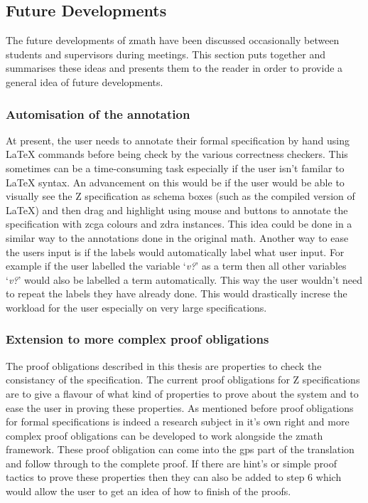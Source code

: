 \subsection{Future Developments}
\label{subsec:futuredevelopments}

The future developments of \gls{zmath} have been discussed occasionally between
students and supervisors during meetings. This section puts together and
summarises these ideas and presents them to the reader in order to provide a
general idea of future developments.

\subsubsection{Automisation of the annotation}
\label{subsubsec:automisation}

At present, the user needs to annotate their formal specification by hand using
\LaTeX{} commands before being check by the various correctness checkers. This
sometimes can be a time-consuming task especially if the user isn't familar to
\LaTeX{} syntax. An advancement on this would be if the user would be able to
visually see the Z specification as schema boxes (such as the compiled version
of \LaTeX{}) and then drag and highlight using mouse and buttons to annotate the
specification with \gls{zcga} colours and \gls{zdra} instances. This idea could
be done in a similar way to the annotations done in the original \gls{math}.
Another way to ease the users input is if the labels would automatically label
what user input. For example if the user labelled the variable `\emph{v?}' as a
term then all other variables `\emph{v?}' would also be labelled a term
automatically. This way the user wouldn't need to repeat the labels they have
already done. This would drastically increse the workload for the user
especially on very large specifications.

\subsubsection{Extension to more complex proof obligations}
\label{subsubsec:extenproofobli}

The proof obligations described in this thesis are properties to check the
consistancy of the specification. The current proof obligations for Z
specifications are to give a flavour of what kind of properties to prove about
the system and to ease the user in proving these properties. As mentioned before
proof obligations for formal specifications is indeed a research subject in it's
own right and more complex proof obligations can be developed to work alongside
the \gls{zmath} framework. These proof obligation can come into the \gls{gps}
part of the translation and follow through to the complete proof. If there are
hint's or simple proof tactics to prove these properties then they can also be
added to step 6 which would allow the user to get an idea of how to finish of
the proofs.

